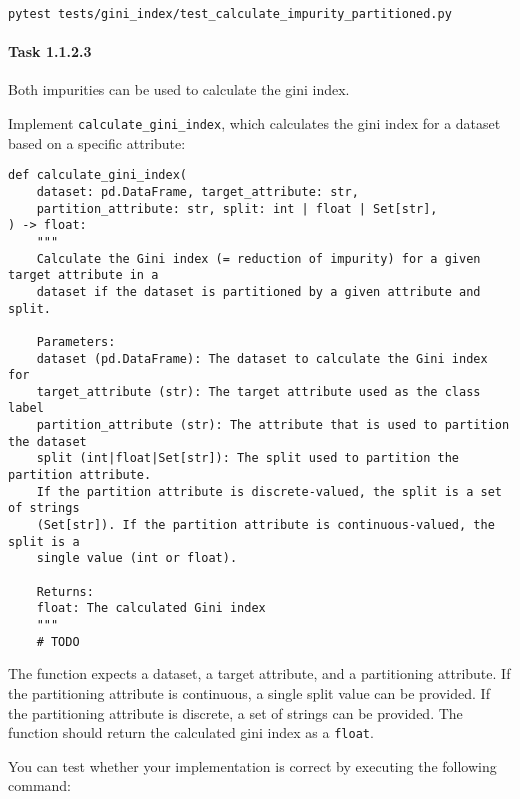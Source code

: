\documentclass[
english,
smallborders
]{i6prcsht}
\begin{document}
\begin{lstlisting}
pytest tests/gini_index/test_calculate_impurity_partitioned.py
\end{lstlisting}

\vspace*{0.1cm}

\paragraph*{Task 1.1.2.3} \hfill

Both impurities can be used to calculate the gini index.

Implement \texttt{calculate\_gini\_index}, which calculates the gini index for a dataset based on a specific attribute:

\vspace*{0.3cm}

\begin{lstlisting}
def calculate_gini_index(
	dataset: pd.DataFrame, target_attribute: str,
	partition_attribute: str, split: int | float | Set[str],
) -> float:
	"""
	Calculate the Gini index (= reduction of impurity) for a given target attribute in a
	dataset if the dataset is partitioned by a given attribute and split.

	Parameters:
	dataset (pd.DataFrame): The dataset to calculate the Gini index for
	target_attribute (str): The target attribute used as the class label
	partition_attribute (str): The attribute that is used to partition the dataset
	split (int|float|Set[str]): The split used to partition the partition attribute.
	If the partition attribute is discrete-valued, the split is a set of strings
	(Set[str]). If the partition attribute is continuous-valued, the split is a
	single value (int or float).

	Returns:
	float: The calculated Gini index
	"""
	# TODO
\end{lstlisting}

\vspace*{0.1cm}

The function expects a dataset, a target attribute, and a partitioning attribute. If the partitioning attribute is continuous, a single split value can be provided. If the partitioning attribute is discrete, a set of strings can be provided. The function should return the calculated gini index as a \texttt{float}.

You can test whether your implementation is correct by executing the following command:

\vspace*{0.3cm}
\end{document}
